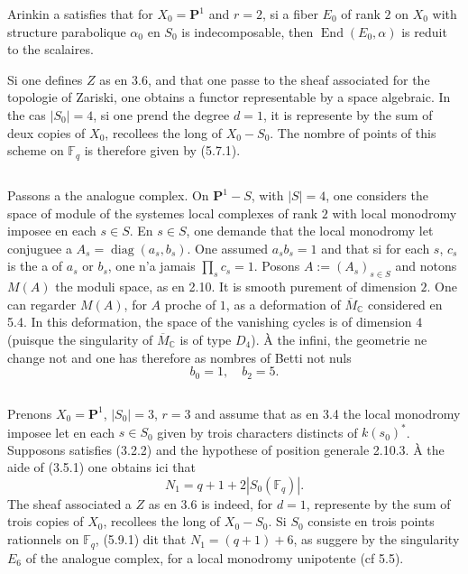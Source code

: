 \documentclass[11pt,a4paper]{article}
\theoremstyle{plain}
\theoremstyle{definition}
\DeclareMathOperator{\End}{End}
\DeclareMathOperator{\diag}{diag}
\newcommand{\F}{\mathbb{F}}
\newcommand{\C}{\mathbb{C}}
\begin{document}
Arinkin a satisfies that for $X_0 = \mathbf{P}^1$ and $r = 2$, si a fiber $E_0$ of rank $2$ on $X_0$ with structure parabolique $\alpha_0$ en $S_0$ is indecomposable, then $\End(E_0, \alpha)$ is reduit to the scalaires.

Si one defines $Z$ as en 3.6, and that one passe to the sheaf associated for the topologie of Zariski, one obtains a functor representable by a space algebraic. In the cas $|S_0| = 4$, si one prend the degree $d = 1$, it is represente by the sum of deux copies of $X_0$, recollees the long of $X_0 - S_0$. The nombre of points of this scheme on $\F_q$ is therefore given by (5.7.1).

\subsection{}
Passons a the analogue complex. On $\mathbf{P}^1 - S$, with $|S| = 4$, one considers the space of module of the systemes local complexes of rank $2$ with local monodromy imposee en each $s \in S$. En $s \in S$, one demande that the local monodromy let conjuguee a $A_s = \diag(a_s, b_s)$. One assumed $a_s b_s = 1$ and that si for each $s$, $c_s$ is the a of $a_s$ or $b_s$, one n'a jamais $\prod_s c_s = 1$. Posons $A := (A_s)_{s \in S}$ and notons $M(A)$ the moduli space, as en 2.10. It is smooth purement of dimension $2$. One can regarder $M(A)$, for $A$ proche of $1$, as a deformation of $\overline{M}_\C$ considered en 5.4. In this deformation, the space of the vanishing cycles is of dimension $4$ (puisque the singularity of $\overline{M}_\C$ is of type $D_4$). \`A the infini, the geometrie ne change not and one has therefore as nombres of Betti not nuls
\begin{equation}
b_0 = 1, \quad b_2 = 5.
\tag{5.8.1}
\end{equation}

\subsection{}
Prenons $X_0 = \mathbf{P}^1$, $|S_0| = 3$, $r = 3$ and assume that as en 3.4 the local monodromy imposee let en each $s \in S_0$ given by trois characters distincts of $k(s_0)^*$. Supposons satisfies (3.2.2) and the hypothese of position generale 2.10.3. \`A the aide of (3.5.1) one obtains ici that
\begin{equation}
N_1 = q + 1 + 2|S_0(\F_q)|.
\tag{5.9.1}
\end{equation}
The sheaf associated a $Z$ as en 3.6 is indeed, for $d = 1$, represente by the sum of trois copies of $X_0$, recollees the long of $X_0 - S_0$. Si $S_0$ consiste en trois points rationnels on $\F_q$, (5.9.1) dit that $N_1 = (q+1) + 6$, as suggere by the singularity $E_6$ of the analogue complex, for a local monodromy unipotente (cf 5.5).
\end{document}
